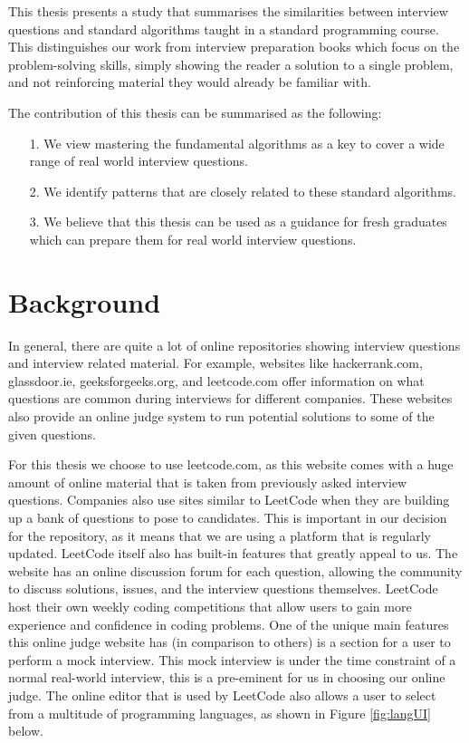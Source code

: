 \documentclass[conference]{IEEEtran}
\begin{document}
This thesis presents a study that summarises the similarities between interview questions and standard algorithms taught in a standard programming course. This distinguishes our work from interview preparation books which focus on the problem-solving skills, simply showing the reader a solution to a single problem, and not reinforcing material they would already be familiar with.


The contribution of this thesis can be summarised as the following: 
\begin{itemize}
\item[1.] We view mastering the fundamental algorithms as a key to cover a wide range of real world interview questions. 
\item[2.] We identify patterns that are closely related to these standard algorithms. 
\item[3.] We believe that this thesis can be used as a guidance for fresh graduates which can prepare them for real world interview questions.  
\end{itemize}
\section{Background}
In general, there are quite a lot of online repositories showing interview questions and interview related material. For example, websites like hackerrank.com, glassdoor.ie, geeksforgeeks.org, and leetcode.com offer information on what questions are common during interviews for different companies. These websites also provide an online judge system to run potential solutions to some of the given questions. 

For this thesis we choose to use leetcode.com\cite{leet1}, as this website comes with a huge amount of online material that is taken from previously asked interview questions. Companies also use sites similar to LeetCode when they are building up a bank of questions to pose to candidates. This is important in our decision for the repository, as it means that we are using a platform that is regularly updated. LeetCode itself also has built-in features that greatly appeal to us. The website has an online discussion forum for each question, allowing the community to discuss solutions, issues, and the interview questions themselves. LeetCode host their own weekly coding competitions that allow users to gain more experience and confidence in coding problems. One of the unique main features this online judge website has (in comparison to others) is a section for a user to perform a mock interview. This mock interview is under the time constraint of a normal real-world interview, this is a pre-eminent for us in choosing our online judge. The online editor that is used by LeetCode also allows a user to select from a multitude of programming languages, as shown in Figure \ref{fig:langUI} below.
\end{document}
